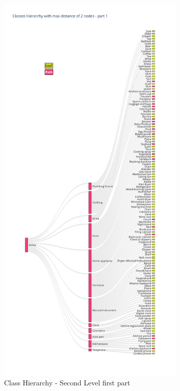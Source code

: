 \documentclass[11pt, a4paper, onecolumn]{article}
\begin{document}
\begin{appendices}
	\begin{figure}[!ht]
		\centering
		\includegraphics[width=0.8\textwidth]{lvl2_classes_pt1.png}
		\caption{\scriptsize Class Hierarchy - Second Level first part}
	\end{figure}
	\begin{figure}[!ht]
		\centering

\end{figure}
\end{appendices}
\end{document}
